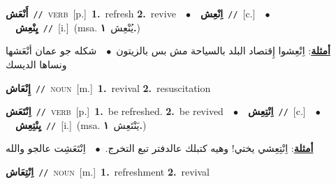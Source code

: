 \documentclass[10pt,a4paper,twoside]{article} %
\begin{document}
\begin{multicols}{2}
{\setlength\topsep{0pt}\textbf{\foreignlanguage{arabic}{أَنْعَش}}\ {\color{gray}\texttt{//}\color{black}}\ \textsc{verb}\ [p.]\ \textbf{1.}~refresh  \textbf{2.}~revive\ \ $\bullet$\ \ \setlength\topsep{0pt}\textbf{\foreignlanguage{arabic}{اِنْعِش}}\ {\color{gray}\texttt{//}\color{black}}\ [c.]\ \ $\bullet$\ \ \setlength\topsep{0pt}\textbf{\foreignlanguage{arabic}{يِنْعِش}}\ {\color{gray}\texttt{//}\color{black}}\ [i.]\ \color{gray}(msa. \foreignlanguage{arabic}{يُنْعِش}~\foreignlanguage{arabic}{\textbf{١.}})\color{black}\  \begin{flushright}\color{gray}\foreignlanguage{arabic}{\textbf{\underline{\foreignlanguage{arabic}{أمثلة}}}: اِنْعِشوا إِقتصاد البلد بالسياحة مش بس بالزيتون\ $\bullet$\ \  شكله جو عمان أنْعَشها ونساها الديسك}\end{flushright}\color{black}} \vspace{2mm}

{\setlength\topsep{0pt}\textbf{\foreignlanguage{arabic}{إِنْعَاش}}\ {\color{gray}\texttt{//}\color{black}}\ \textsc{noun}\ [m.]\ \textbf{1.}~revival  \textbf{2.}~resuscitation\ } \vspace{2mm}

{\setlength\topsep{0pt}\textbf{\foreignlanguage{arabic}{اِنْتَعَش}}\ {\color{gray}\texttt{//}\color{black}}\ \textsc{verb}\ [p.]\ \textbf{1.}~be refreshed.  \textbf{2.}~be revived\ \ $\bullet$\ \ \setlength\topsep{0pt}\textbf{\foreignlanguage{arabic}{اِنْتِعِش}}\ {\color{gray}\texttt{//}\color{black}}\ [c.]\ \ $\bullet$\ \ \setlength\topsep{0pt}\textbf{\foreignlanguage{arabic}{يِنْتِعِش}}\ {\color{gray}\texttt{//}\color{black}}\ [i.]\ \color{gray}(msa. \foreignlanguage{arabic}{يَنْتَعِش}~\foreignlanguage{arabic}{\textbf{١.}})\color{black}\  \begin{flushright}\color{gray}\foreignlanguage{arabic}{\textbf{\underline{\foreignlanguage{arabic}{أمثلة}}}: اِنْتِعِشي يختي! وهيه كتبلك عالدفتر تبع التخرج.\ $\bullet$\ \  اِنْتَعَشِت عالجو والله}\end{flushright}\color{black}} \vspace{2mm}

{\setlength\topsep{0pt}\textbf{\foreignlanguage{arabic}{اِنْتِعَاش}}\ {\color{gray}\texttt{//}\color{black}}\ \textsc{noun}\ [m.]\ \textbf{1.}~refreshment  \textbf{2.}~revival\ } \vspace{2mm}


\end{multicols}
\end{document}
